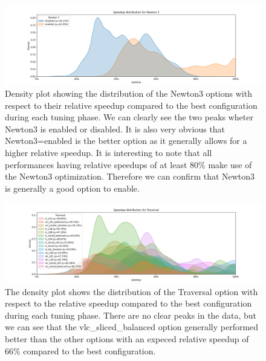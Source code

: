 \begin{figure}[H]
    \centering
    \includegraphics[width=\columnwidth,trim={1cm 0 2cm 1.5cm},clip]{figures/DataAnalytics/speedup_Newton 3.png}
    \caption[Speedup density plot of Newton 3 option]{Density plot showing the distribution of the Newton3 options with respect to their relative speedup compared to the best configuration during each tuning phase. We can clearly see the two peaks wheter Newton3 is enabled or disabled. It is also very obvious that Newton3=enabled is the better option as it generally allows for a higher relative speedup. It is interesting to note that all performances having relative speedups of at least 80\% make use of the Newton3 optimization. Therefore we can confirm that Newton3 is generally a good option to enable.}
    \label{fig:inputAnalysisDensityNewton3}
\end{figure}

\begin{figure}[H]
    \centering
    \includegraphics[width=\columnwidth,trim={1cm 0 2cm 1.5cm},clip]{figures/DataAnalytics/speedup_Traversal.png}
    \caption[Speedup density plot of Traversal option]{The density plot shows the distribution of the Traversal option with respect to the relative speedup compared to the best configuration during each tuning phase. There are no clear peaks in the data, but we can see that the vlc\_sliced\_balanced option generally performed better than the other options with an expeced relative speedup of 66\% compared to the best configuration.}
    \label{fig:inputAnalysisDensityTraversal}
\end{figure}

